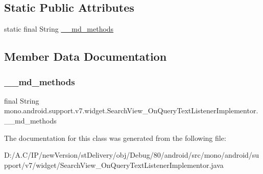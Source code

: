 \subsection*{Static Public Attributes}
\begin{DoxyCompactItemize}
\item 
static final String \hyperlink{classmono_1_1android_1_1support_1_1v7_1_1widget_1_1_search_view___on_query_text_listener_implementor_ae251e6ade13e5dd277fac9fdfb2113ff}{\+\_\+\+\_\+md\+\_\+methods}
\end{DoxyCompactItemize}


\subsection{Member Data Documentation}
\mbox{\label{classmono_1_1android_1_1support_1_1v7_1_1widget_1_1_search_view___on_query_text_listener_implementor_ae251e6ade13e5dd277fac9fdfb2113ff}} 
\subsubsection{\texorpdfstring{\+\_\+\+\_\+md\+\_\+methods}{\_\_md\_methods}}
{\footnotesize\ttfamily final String mono.\+android.\+support.\+v7.\+widget.\+Search\+View\+\_\+\+On\+Query\+Text\+Listener\+Implementor.\+\_\+\+\_\+md\+\_\+methods\hspace{0.3cm}{\ttfamily [static]}}



The documentation for this class was generated from the following file\+:\begin{DoxyCompactItemize}
\item 
D\+:/\+A.\+C/\+I\+P/new\+Version/st\+Delivery/obj/\+Debug/80/android/src/mono/android/support/v7/widget/Search\+View\+\_\+\+On\+Query\+Text\+Listener\+Implementor.\+java\end{DoxyCompactItemize}
